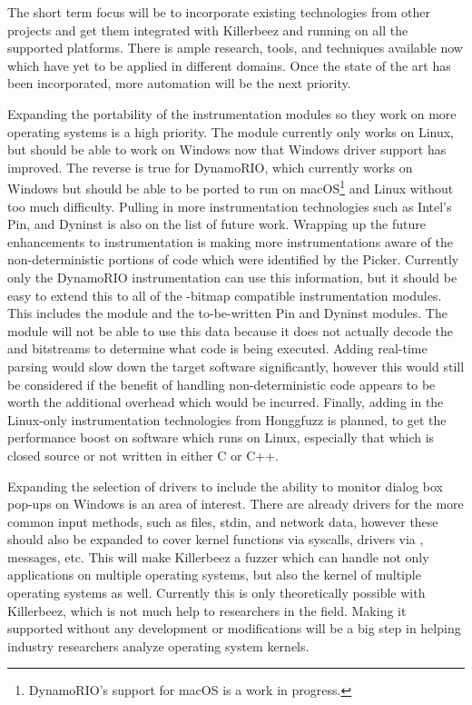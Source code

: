 The short term focus will be to incorporate existing technologies from other
projects and get them integrated with Killerbeez and running on all the
supported platforms.  There is ample research, tools, and techniques available
now which have yet to be applied in different domains. Once the state of the
art has been incorporated, more automation will be the next priority.

Expanding the portability of the instrumentation modules so they work on more
operating systems is a high priority. The \IPT{} module currently only works
on Linux, but should be able to work on Windows now that Windows \IPT{} driver support has
improved. The reverse is true for DynamoRIO, which currently works on Windows
but should be able to be ported to run on macOS\footnote{DynamoRIO's
support for macOS is a work in progress.} and Linux without too much difficulty.
Pulling in more instrumentation technologies such as Intel's Pin,
and Dyninst\cite{dyninst} is also on the list of future work. Wrapping up the
future enhancements to instrumentation is making more instrumentations aware of
the non-deterministic portions of code which were identified by the Picker.
Currently only the DynamoRIO instrumentation can use this information, but
it should be easy to extend this to all of the \AFL{}-bitmap compatible
instrumentation modules.  This includes the \AFL{} module and the to-be-written
Pin and Dyninst modules.  The \IPT{} module will not be able to use this data
because it does not actually decode the \TNT{} and \TIP{} bitstreams to determine what
code is being executed. Adding real-time parsing would slow down the target
software significantly, however this would still be considered if the benefit
of handling non-deterministic code appears to be worth the additional overhead
which would be incurred. Finally, adding in the Linux-only instrumentation
technologies from Honggfuzz\cite{honggfuzz} is planned, to get the performance
boost on software which runs on Linux, especially that which is closed source
or not written in either C or C++.

Expanding the selection of drivers to include the ability to monitor dialog
box pop-ups on Windows is an area of interest. There are already drivers for
the more common input methods, such as files, stdin, and network data, however
these should also be expanded to cover kernel functions via syscalls, drivers
via \IOCTLs{}, \IPC{} messages, etc. This will make Killerbeez a fuzzer
which can handle not only applications on multiple operating systems, but also
the kernel of multiple operating systems as well.  Currently this is only
theoretically possible with Killerbeez, which is not much help to researchers
in the field. Making it supported without any development or modifications
will be a big step in helping industry researchers analyze operating system kernels.

